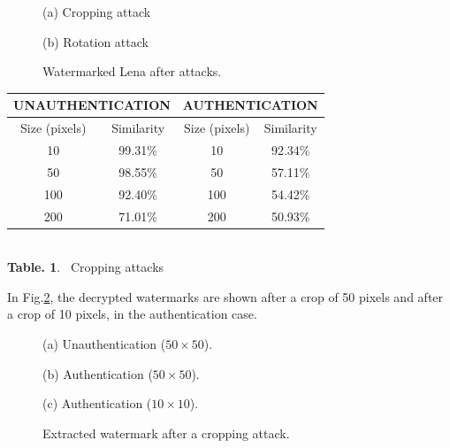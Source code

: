 \begin{figure}[htb]
\begin{minipage}[b]{.48\linewidth}
  \centering
 \centerline{}
  \centerline{(a) Cropping attack}
\end{minipage}
\hfill
\begin{minipage}[b]{0.48\linewidth}
  \centering
 \centerline{}
  \centerline{(b) Rotation attack}
\end{minipage}
\caption{Watermarked Lena after attacks.}
\label{fig:LenaAttack}
\end{figure}




\begin{center}
\begin{footnotesize}
\begin{tabular}{|c|c||c|c|}
\hline
\multicolumn{2}{|c||}{UNAUTHENTICATION}  & \multicolumn{2}{c|}{AUTHENTICATION}\\ 
\hline
Size (pixels) & Similarity & Size (pixels) & Similarity \\
 \hline
10 & 99.31\% & 10 & 92.34\% \\
50 & 98.55\% & 50 & 57.11\% \\
100 & 92.40\% & 100 & 54.42\% \\
200 & 71.01\% & 200 & 50.93\% \\
\hline
\end{tabular}
\end{footnotesize}\\
\vspace{0.5cm}
\textbf{Table. 1}. ~Cropping attacks
\label{Table1}
\end{center}


In Fig.\ref{fig:Dechiffrement_invader}, the decrypted watermarks are shown after a crop of 50 pixels and after a crop of 10 pixels, in the authentication case.

\begin{figure}[htb]
\begin{minipage}[b]{1.0\linewidth}
  \centering
 \centerline{}
  \centerline{(a) Unauthentication ($50\times 50$).}
\end{minipage}
%
\begin{minipage}[b]{.48\linewidth}
  \centering
 \centerline{}
  \centerline{(b) Authentication  ($50\times 50$).}
\end{minipage}
\hfill
\begin{minipage}[b]{0.48\linewidth}
  \centering
 \centerline{}
  \centerline{(c) Authentication  ($10\times 10$).}
\end{minipage}
%
\caption{Extracted watermark after a cropping attack.}
\label{fig:Dechiffrement_invader}
%
\end{figure}


